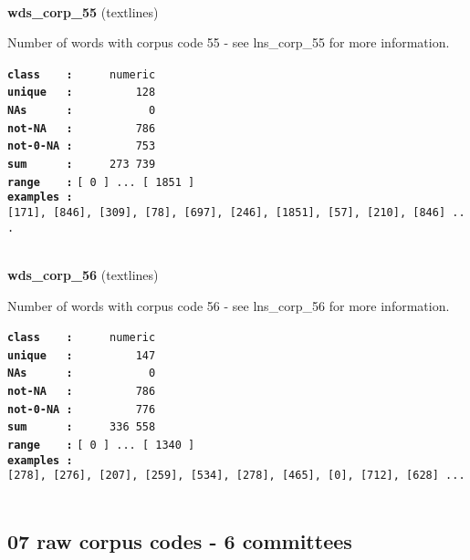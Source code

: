 \documentclass[]{article}
\begin{document}
~

\textbf{wds\_corp\_55} (textlines)

Number of words with corpus code 55 - see lns\_corp\_55 for more
information.

\textbf{\texttt{class\ \ \ \ :}} \texttt{~~~~~numeric}\\
\textbf{\texttt{unique\ \ \ :}} \texttt{~~~~~~~~~128}\\
\textbf{\texttt{NAs\ \ \ \ \ \ :}} \texttt{~~~~~~~~~~~0}\\
\textbf{\texttt{not-NA\ \ \ :}} \texttt{~~~~~~~~~786}\\
\textbf{\texttt{not-0-NA\ :}} \texttt{~~~~~~~~~753}\\
\textbf{\texttt{sum\ \ \ \ \ \ :}} \texttt{~~~~~273~739}\\
\textbf{\texttt{range\ \ \ \ :}}
\texttt{{[}\ 0\ {]}\ ...\ {[}\ 1851\ {]}}\\
\textbf{\texttt{examples\ :}}
\texttt{{[}171{]},\ {[}846{]},\ {[}309{]},\ {[}78{]},\ {[}697{]},\ {[}246{]},\ {[}1851{]},\ {[}57{]},\ {[}210{]},\ {[}846{]}\ ...}\\

~

\textbf{wds\_corp\_56} (textlines)

Number of words with corpus code 56 - see lns\_corp\_56 for more
information.

\textbf{\texttt{class\ \ \ \ :}} \texttt{~~~~~numeric}\\
\textbf{\texttt{unique\ \ \ :}} \texttt{~~~~~~~~~147}\\
\textbf{\texttt{NAs\ \ \ \ \ \ :}} \texttt{~~~~~~~~~~~0}\\
\textbf{\texttt{not-NA\ \ \ :}} \texttt{~~~~~~~~~786}\\
\textbf{\texttt{not-0-NA\ :}} \texttt{~~~~~~~~~776}\\
\textbf{\texttt{sum\ \ \ \ \ \ :}} \texttt{~~~~~336~558}\\
\textbf{\texttt{range\ \ \ \ :}}
\texttt{{[}\ 0\ {]}\ ...\ {[}\ 1340\ {]}}\\
\textbf{\texttt{examples\ :}}
\texttt{{[}278{]},\ {[}276{]},\ {[}207{]},\ {[}259{]},\ {[}534{]},\ {[}278{]},\ {[}465{]},\ {[}0{]},\ {[}712{]},\ {[}628{]}\ ...}\\

~

\subsection{07 raw corpus codes - 6
committees}\label{raw-corpus-codes---6-committees}
\end{document}
